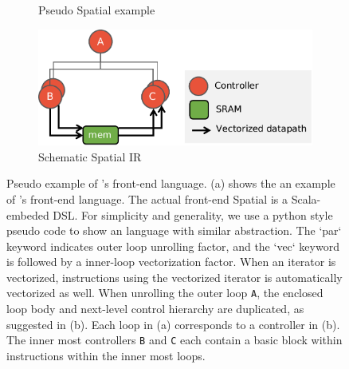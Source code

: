 \begin{figure}
\centering
\begin{subfigure}[b]{0.4\textwidth}
\inputminted{python}{code/spatialegpar.py}
\caption{Pseudo Spatial example}
\end{subfigure}
\hfill
\begin{subfigure}[b]{0.58\textwidth}
\includegraphics[width=1\textwidth]{figs/spatialir.pdf}
\caption{Schematic Spatial IR}
\end{subfigure}
\caption[Spatial Example]{
  Pseudo example of \name's front-end language.
  (a) shows the an example of \name's front-end language. The actual front-end Spatial is a
  Scala-embeded DSL. For simplicity and generality, we use a python style pseudo code to show an
  language with similar abstraction. The `par` keyword indicates outer loop unrolling factor, and
  the `vec` keyword is followed by a inner-loop vectorization factor.
  When an iterator is vectorized, instructions using the vectorized iterator is automatically
  vectorized as well. When unrolling the outer loop \texttt{A}, the enclosed loop body and
  next-level control hierarchy are duplicated, as suggested in (b).
  Each loop in (a) corresponds to a controller in (b). The inner most controllers \texttt{B} and
  \texttt{C} each contain a basic block within instructions within the inner most loops.
}
\label{fig:spatialegpar}
\end{figure}

